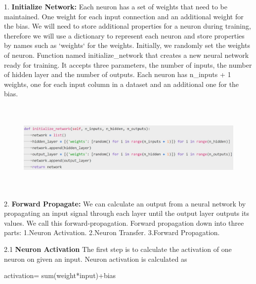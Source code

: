 1. \textbf{Initialize Network:}
Each neuron has a set of weights that need to be maintained. One weight for each input connection and an additional weight for the bias. We will need to store additional properties for a neuron during training, therefore we will use a dictionary to represent each neuron and store properties by names such as ‘weights‘ for the weights.
Initially, we randomly set the weights of neuron.\newline
Function named initialize\_network that creates a new neural network ready for training. It accepts three parameters, the number of inputs, the number of  hidden layer and the number of outputs.\newline
Each neuron  has n\_inputs + 1 weights, one for each input column in a dataset and an additional one for the bias.

\begin{figure}[H]
\begin{center}
\includegraphics[width=160mm,height=45mm]{backexplain/initializeNetwork.jpg}
\end{center}
\end{figure}

2. \textbf{Forward Propagate:}
We can calculate an output from a neural network by propagating an input signal through each layer until the output layer outputs its values.
We call this forward-propagation.\newline
Forward propagation down into three parts:\newline
    1.Neuron Activation.\newline
    2.Neuron Transfer.\newline
    3.Forward Propagation.\newline
    
2.1 \textbf{Neuron Activation}
The first step is to calculate the activation of one neuron on given an input.\newline
Neuron activation is calculated as\newline
           \centerline{activation= sum(weight*input)+bias }

